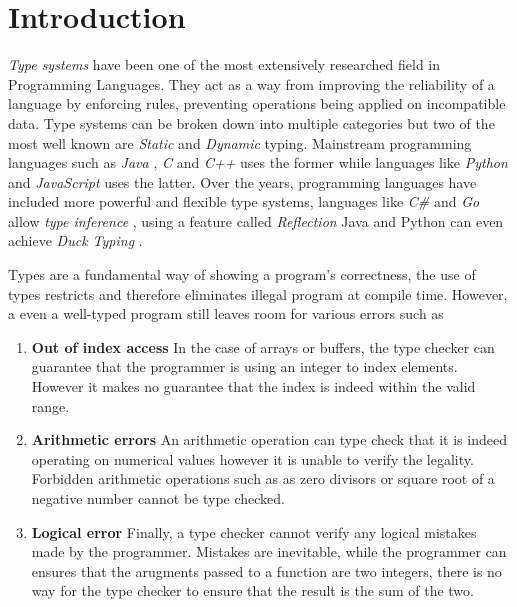 \documentclass[a4paper,12pt]{report}
\begin{document}
\pagestyle{empty}
\singlespacing

\onehalfspacing

\singlespacing


\setcounter{page}{0}
\pagestyle{plain}
\tableofcontents
\listoffigures
\listoftables

\onehalfspacing


\chapter{Introduction}
\setcounter{page}{1} 

\textit{Type systems} \cite{typesystem} have been one of the most extensively researched field in 
Programming Languages. They act as a way from improving the reliability of a 
language by enforcing rules, preventing operations being applied on 
incompatible data. Type systems can be broken down into multiple categories but 
two of the most well known are \textit{Static} \cite{staticTyping} and 
\textit{Dynamic} \cite{dynamicTyping} typing. Mainstream programming 
languages such as \textit{Java} \cite{java}, \textit{C} \cite{c} and \textit{C++} \cite{cpp} 
uses the former while languages like \textit{Python} \cite{python} and 
\textit{JavaScript} \cite{js} uses the latter. 
Over the years, programming languages have included more powerful and flexible 
type systems, languages like \textit{C\#} \cite{cSharp} and \textit{Go} \cite{goInferenceType} allow 
\textit{type inference} \cite{inferenceType}, using a feature called \textit{Reflection} 
Java and Python can even achieve \textit{Duck Typing} \cite{javaDuckType}.

\par
Types are a fundamental way of showing a program's correctness, the use of types 
restricts and therefore eliminates illegal program at compile time. However, a 
even a well-typed program still leaves room for various errors such as 
\begin{enumerate}
  \item {\textbf{Out of index access}} In the case of arrays or buffers, the type checker 
  can guarantee that the programmer is using an integer to index elements. 
  However it makes no guarantee that the index is indeed within the valid range. 
  \item {\textbf{Arithmetic errors}} An arithmetic operation can type check that it is 
  indeed operating on numerical values however it is unable to verify the 
  legality. Forbidden arithmetic operations such as as zero divisors or square 
  root of a negative number cannot be type checked. 
  \item {\textbf{Logical error}} Finally, a type checker cannot verify any logical 
  mistakes made by the programmer. Mistakes are inevitable, while the programmer 
  can ensures that the arugments passed to a function are two integers, there is 
  no way for the type checker to ensure that the result is the sum of the two. 
\end{enumerate}
\end{document}
